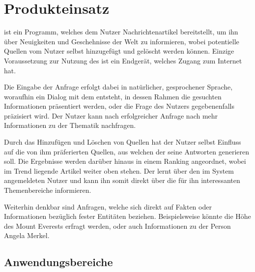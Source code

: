 

\chapter{Produkteinsatz}

\NewsGenie ist ein Programm, welches dem Nutzer Nachrichtenartikel bereitstellt, um ihn über Neuigkeiten und Geschehnisse der Welt zu informieren, wobei potentielle Quellen vom Nutzer selbst hinzugefügt und gelöscht werden können. Einzige Voraussetzung zur Nutzung des \NewsGenie ist ein Endgerät, welches Zugang zum Internet hat.

Die Eingabe der Anfrage erfolgt dabei in natürlicher, gesprochener Sprache, woraufhin ein Dialog mit dem \NewsGenie entsteht, in dessen Rahmen die gesuchten Informationen präsentiert werden, oder die Frage des Nutzers gegebenenfalls präzisiert wird. Der Nutzer kann nach erfolgreicher Anfrage nach mehr Informationen zu der Thematik nachfragen.

Durch das Hinzufügen und Löschen von Quellen hat der Nutzer selbst Einfluss auf die von ihm präferierten Quellen, aus welchen der \NewsGenie seine Antworten generieren soll. Die Ergebnisse werden darüber hinaus in einem Ranking angeordnet, wobei im Trend liegende Artikel weiter oben stehen. Der \NewsGenie lernt über den im System angemeldeten Nutzer und kann ihn somit direkt über die für ihn interessanten Themenbereiche informieren.

Weiterhin denkbar sind Anfragen, welche sich direkt auf Fakten oder Informationen bezüglich fester Entitäten beziehen.
Beispielsweise könnte die Höhe des Mount Everests erfragt werden, oder auch Informationen zu der Person Angela Merkel.

\section{Anwendungsbereiche}

